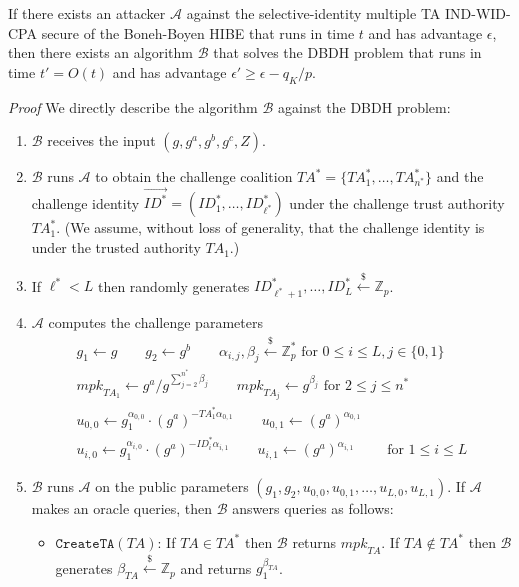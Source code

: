 \documentclass{llncs}
\newcommand{\A}{\mathcal{A}}
\newcommand{\B}{\mathcal{B}}
\newcommand{\Zbb}{\mathbb{Z}}
\newcommand{\ID}{\mathit{ID}}
\newcommand{\TA}{\mathit{TA}}
\newcommand{\mpk}{\mathit{mpk}}
\newcommand{\getsr}{\stackrel{{\scriptscriptstyle\$}}{\gets}}
\begin{document}
\begin{theorem}
If there exists an attacker $\A$ against the selective-identity multiple TA IND-WID-CPA secure of the Boneh-Boyen HIBE that runs in time $t$ and has advantage $\epsilon$, then there exists an algorithm $\B$ that solves the DBDH problem that runs in time $t'=O(t)$ and has advantage $\epsilon' \geq \epsilon -q_{K}/p$.
\end{theorem}
\emph{Proof} We directly describe the algorithm $\B$ against the DBDH problem:
\begin{enumerate}
\item $\B$ receives the input $(g,g^{a},g^{b},g^{c},Z)$.
\item $\B$ runs $\A$ to obtain the challenge coalition $\TA^{*}=\{\TA^{*}_{1},\ldots,\TA^{*}_{n^{*}}\}$ and the challenge identity $\vec{\ID^{*}}=(\ID^{*}_{1},\ldots,\ID^{*}_{\ell^{*}})$ under the challenge trust authority $\TA^{*}_{1}$. (We assume, without loss of generality, that the challenge identity is under the trusted authority $\TA_{1}$.)
\item If $\ell^{*} < L$ then randomly generates $\ID^{*}_{\ell^{*}+1},\ldots,\ID^{*}_{L}\getsr \Zbb_{p}$.
\item $\A$ computes the challenge parameters
    \begin{displaymath}
    \begin{array}{c}
    g_{1} \gets g \qquad g_{2}\gets g^{b} \qquad \alpha_{i,j}, \beta_{j} \getsr \Zbb_{p}^{*} \mbox{ for } 0\leq i\leq L, j\in \{0,1\}\\
    \mpk_{\TA_{1}} \gets g^{a}/g^{\sum_{j=2}^{n^{*}} \beta_{j}} \qquad \mpk_{\TA_{j}} \gets g^{\beta_{j}} \mbox{ for } 2\leq j\leq n^{*}\\
    u_{0,0} \gets g_{1}^{\alpha_{0,0}}\cdot (g^{a})^{-\TA^{*}_{1}\alpha_{0,1}} \qquad u_{0,1} \gets (g^{a})^{\alpha_{0,1}}\\
    u_{i,0} \gets g_{1}^{\alpha_{i,0}}\cdot (g^{a})^{-\ID^{*}_{i}\alpha_{i,1}} \qquad u_{i,1} \gets (g^{a})^{\alpha_{i,1}} \qquad \mbox{ for } 1\leq i\leq L
    \end{array}
    \end{displaymath}
\item $\B$ runs $\A$ on the public parameters $(g_{1},g_{2},u_{0,0},u_{0,1},\ldots,u_{L,0},u_{L,1})$. If $\A$ makes an oracle queries, then $\B$ answers queries as follows:
    \begin{itemize}
    \item $\texttt{CreateTA}(\TA)$: If $\TA\in \TA^{*}$ then $\B$ returns $\mpk_{\TA}$. If $\TA\notin \TA^{*}$ then $\B$ generates $\beta_{\TA}\getsr \Zbb_{p}$ and returns $g_{1}^{\beta_{\TA}}$.

\end{itemize}
\end{enumerate}
\end{document}
